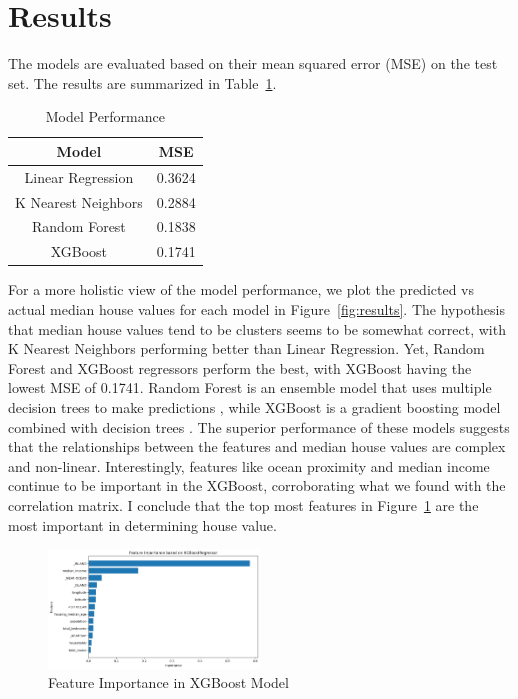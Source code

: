 \documentclass[letterpaper,twocolumn,10pt]{article}
\begin{document}
\section{Results}

The models are evaluated based on their mean squared error (MSE) on the test set.
The results are summarized in Table~\ref{tab:results}.

\begin{table}[h]
    \centering
    \begin{tabular}{|c|c|}
        \hline
        Model & MSE \\
        \hline
        Linear Regression & 0.3624 \\
        K Nearest Neighbors & 0.2884 \\
        Random Forest & 0.1838 \\
        XGBoost & 0.1741 \\
        \hline
    \end{tabular}
    \caption{Model Performance}
    \label{tab:results}
\end{table}

For a more holistic view of the model performance, we plot the predicted vs actual median house values for each model in Figure~\ref{fig:results}.
The hypothesis that median house values tend to be clusters seems to be somewhat correct, with K Nearest Neighbors performing better than Linear Regression.
Yet, Random Forest and XGBoost regressors perform the best, with XGBoost having the lowest MSE of 0.1741.
Random Forest is an ensemble model that uses multiple decision trees to make predictions \cite{randomforest}, while XGBoost is a gradient boosting model combined with decision trees \cite{xgboost}.
The superior performance of these models suggests that the relationships between the features and median house values are complex and non-linear. 
Interestingly, features like ocean proximity and median income continue to be important in the XGBoost, corroborating what we found with the correlation matrix.
I conclude that the top most features in Figure~\ref{fig:xgboost_import} are the most important in determining house value.

\begin{figure}
    \centering
    \includegraphics[width=0.5\textwidth]{images/feature_import_xgb.png}
    \caption{Feature Importance in XGBoost Model}
    \label{fig:xgboost_import}
\end{figure}
\end{document}
